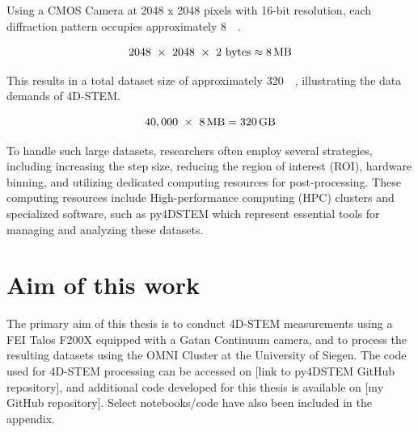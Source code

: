 Using a CMOS Camera at 2048 x 2048 pixels with 16-bit resolution, each diffraction pattern occupies approximately \SI{8}{\mega\byte}.

\begin{equation}
    2048 \ \times \ 2048 \ \times \ 2 \ \text{bytes} \approx \SI{8}{\mega\byte}
\end{equation}

This results in a total dataset size of approximately \SI{320}{\giga\byte}, illustrating the data demands of 4D-STEM.

\begin{equation}
    40,000 \ \times \ \SI{8}{\mega\byte} = \SI{320}{\giga\byte}
\end{equation}

To handle such large datasets, researchers often employ several strategies, including increasing the step size, reducing the region of interest (ROI), hardware binning, and utilizing dedicated computing resources for post-processing. 
These computing resources include High-performance computing (HPC) clusters and specialized software, such as py4DSTEM which represent essential tools for managing and analyzing these datasets.



\section{Aim of this work}

The primary aim of this thesis is to conduct 4D-STEM measurements using a FEI Talos F200X equipped with a Gatan Continuum camera, and to process the resulting datasets using the OMNI Cluster at the University of Siegen.
The code used for 4D-STEM processing can be accessed on [link to py4DSTEM GitHub repository], and additional code developed for this thesis is available on [my GitHub repository]. 
Select notebooks/code have also been included in the appendix.
